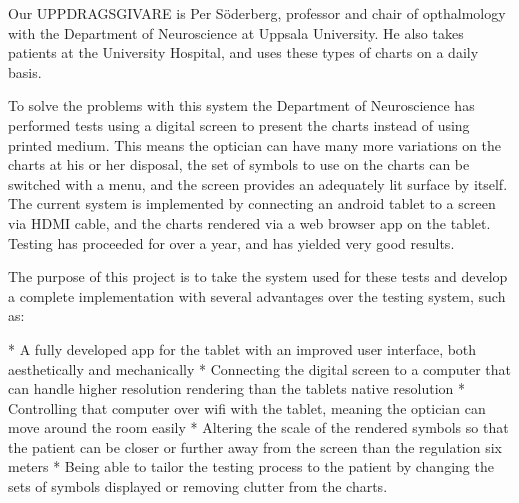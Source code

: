 

Our UPPDRAGSGIVARE %
is Per Söderberg, professor and chair of opthalmology with the Department of Neuroscience at Uppsala University. He also takes patients at the University Hospital, and uses these types of charts on a daily basis. 


To solve the problems with this system the Department of Neuroscience has performed tests using a digital screen to present the charts instead of using printed medium. This means the optician can have many more variations on the charts at his or her disposal, the set of symbols to use on the charts can be switched with a menu, and the screen provides an adequately lit surface by itself. The current system is implemented by connecting an android tablet to a screen via HDMI cable, and the charts rendered via a web browser app on the tablet. Testing has proceeded for over a year, and has yielded very good results.

The purpose of this project is to take the system used for these tests and develop a complete implementation with several advantages over the testing system, such as:

* A fully developed app for the tablet with an improved user interface, both aesthetically and mechanically
* Connecting the digital screen to a computer that can handle higher resolution rendering than the tablets native resolution
* Controlling that computer over wifi with the tablet, meaning the optician can move around the room easily
* Altering the scale of the rendered symbols so that the patient can be closer or further away from the screen than the regulation six meters
* Being able to tailor the testing process to the patient by changing the sets of symbols displayed or removing clutter from the charts.

